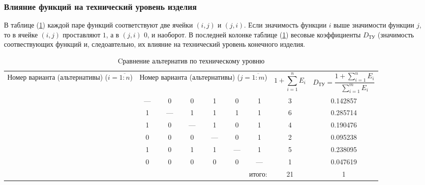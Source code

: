 \subsubsection{Влияние функций на технический уровень изделия}
В таблице (\ref{tbl_technical_lvl_comparison}) каждой паре функций
соответствуют две ячейки $(i, j)$ и $(j, i)$.
Если значимость функции $i$ выше значимости функции
$j$, то в ячейке $(i, j)$ проставляют $1$, а в $(j, i)$ $0$, и наоборот.
В последней колонке таблице (\ref{tbl_technical_lvl_comparison}) весовые
коэффициенты $D_{\text{ТУ}}$ (значимость соотвествующих функций и, следоавтельно,
их влияние на технический уровень конечного изделия.
\begin{table}[ht!]
    \centering
    \begin{tabular}{|c|c|c|c|c|c|c|c|c|}
        \hline
        \multirow{2}{2.4cm}{
            \centering
            Номер варианта (альтернативы) ($i = \overline{1:n}$)
        } &
        \multicolumn{6}{c|}{
            \parbox[t]{2.4cm}{
                \centering
                Номер варианта (альтернативы) ($j = \overline{1:m}$)
            }
        } &
        \multirow{2}{1.7cm}[0pt]{
            \centering
            $$1 + \sum_{i=1}^n E_i$$
        } &
        \multirow{2}{3.2cm}{
            \centering
            $$ D_\text{ТУ} = \frac{1 + \sum_{i=1}^n E_i}{\sum_{i=1}^m E_i}$$
        } \\
        &
        \centering{1} &
        \centering{2} &
        \centering{3} &
        \centering{4} &
        \centering{5} &
        \centering{6} & & \\
        \hline \hline
        \centering{1} &---& 0 & 0 & 1 & 0 & 1 & 3 & 0.142857 \\ \hline
        \centering{2} & 1 &---& 1 & 1 & 1 & 1 & 6 & 0.285714 \\ \hline
        \centering{3} & 1 & 0 &---& 1 & 0 & 1 & 4 & 0.190476 \\ \hline
        \centering{4} & 0 & 0 & 0 &---& 0 & 1 & 2 & 0.095238 \\ \hline
        \centering{5} & 1 & 0 & 1 & 1 &---& 1 & 5 & 0.238095 \\ \hline
        \centering{6} & 0 & 0 & 0 & 0 & 0 &---& 1 & 0.047619 \\ \hline
        \hline
        \multicolumn{7}{|r|}{итого:} & 21 & 1 \\
        \hline
    \end{tabular}
    \caption{Cравнение альтернатив по техническому уровню}
    \label{tbl_technical_lvl_comparison}
\end{table}

